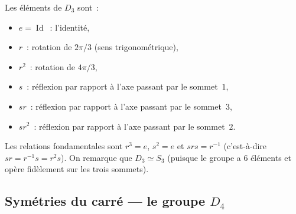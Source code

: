 \documentclass[12pt,a4paper,openany]{book}
\theoremstyle{definition}
\DeclareMathOperator{\Id}{Id}
\newcommand{\iso}{\simeq}
\newcommand{\abs}[1]{\lvert #1 \rvert}
\begin{document}
\begin{center}
\end{center}

Les éléments de $D_3$ sont~:
\begin{itemize}
  \item $e = \Id$~: l'identité,
  \item $r$~: rotation de $2\pi/3$ (sens trigonométrique),
  \item $r^2$~: rotation de $4\pi/3$,
  \item $s$~: réflexion par rapport à l'axe passant par le sommet~$1$,
  \item $sr$~: réflexion par rapport à l'axe passant par le sommet~$3$,
  \item $sr^2$~: réflexion par rapport à l'axe passant par le sommet~$2$.
\end{itemize}
Les relations fondamentales sont $r^3 = e$, $s^2 = e$ et $srs = r^{-1}$ (c'est-à-dire
$sr = r^{-1}s = r^2 s$). On remarque que $D_3 \iso S_3$ (puisque le groupe a $6$
éléments et opère fidèlement sur les trois sommets).

\subsection{Symétries du carré --- le groupe $D_4$}
\label{subsec:D4}
\end{document}
